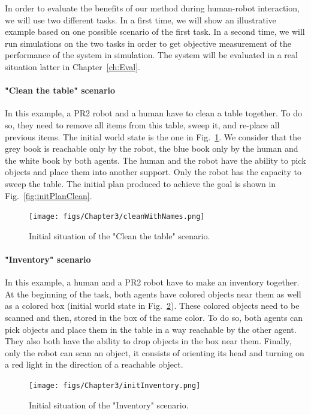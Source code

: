 \documentclass[english,a4paper,11pt,twoside]{StyleThese}
\begin{document}
In order to evaluate the benefits of our method during human-robot interaction, we will use two different tasks. In a first time, we will show an illustrative example based on one possible scenario of the first task. In a second time, we will run simulations on the two tasks in order to get objective measurement of the performance of the system in simulation. The system will be evaluated in a real situation latter in Chapter~\ref{ch:Eval}.

\paragraph{"Clean the table" scenario}

In this example, a PR2 robot and a human have to clean a table together. To do so, they need to remove all items from this table, sweep it, and re-place all previous items. The initial world state is the one in Fig.~\ref{fig:initClean}. We consider that the grey book is reachable only by the robot, the blue book only by the human and the white book by both agents. The human and the robot have the ability to pick objects and place them into another support. Only the robot has the capacity to sweep the table. The initial plan produced to achieve the goal is shown in Fig.~\ref{fig:initPlanClean}.

\begin{figure}[!h]
	\centering
    \texttt{[image: figs/Chapter3/cleanWithNames.png]}
    \caption{Initial situation of the "Clean the table" scenario.}
    \label{fig:initClean}
\end{figure}

\paragraph{"Inventory" scenario}

In this example, a human and a PR2 robot have to make an inventory together. At the beginning of the task, both agents have colored objects near them as well as a colored box (initial world state in Fig.~\ref{fig:initInventory}). These colored objects need to be scanned and then, stored in the box of the same color. To do so, both agents can pick objects and place them in the table in a way reachable by the other agent. They also both have the ability to drop objects in the box near them. Finally, only the robot can scan an object, it consists of orienting its head and turning on a red light in the direction of a reachable object. 

\begin{figure}[!h]
	\centering
    \texttt{[image: figs/Chapter3/initInventory.png]}
    \caption{Initial situation of the "Inventory" scenario.}
    \label{fig:initInventory}
\end{figure}
\end{document}
